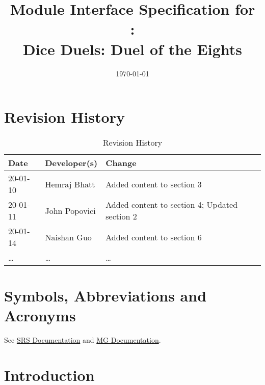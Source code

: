 \documentclass[12pt, titlepage]{article}
\begin{document}
\title{Module Interface Specification for\\\progname:\\Dice Duels: Duel of the Eights}

\author{\authname}

\date{\today}

\maketitle


\section{Revision History}

\begin{table}[hp]
\caption{Revision History} \label{TblRevisionHistory}
\begin{tabularx}{\textwidth}{llX}
\toprule
\textbf{Date} & \textbf{Developer(s)} & \textbf{Change}\\
\midrule
20-01-10 & Hemraj Bhatt & Added content to section 3\\
20-01-11 & John Popovici & Added content to section 4; Updated section 2\\
20-01-14 & Naishan Guo & Added content to section 6\\
\dots & \dots & \dots\\
\bottomrule
\end{tabularx}
\end{table}


\newpage

\tableofcontents

\newpage


\section{Symbols, Abbreviations and Acronyms}

See \href{https://github.com/John-Popovici/duel-of-the-eights/blob/main/docs/SRS/SRS.pdf}{SRS Documentation} and \href{file:///C:/Users/a/Documents/Coding/duel-of-the-eights/docs/Design/SoftArchitecture/MG.pdf}{MG Documentation}.


\section{Introduction}
\end{document}
